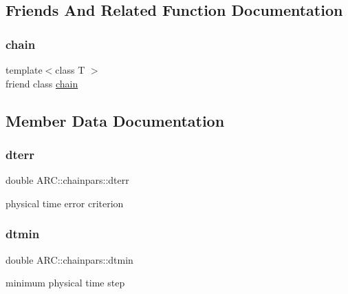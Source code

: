 \subsection{Friends And Related Function Documentation}
\hypertarget{classARC_1_1chainpars_a498fbb4337b9878a5f0044996e4a2489}{}\label{classARC_1_1chainpars_a498fbb4337b9878a5f0044996e4a2489} 
\subsubsection{\texorpdfstring{chain}{chain}}
{\footnotesize\ttfamily template$<$class T $>$ \\
friend class \hyperlink{classARC_1_1chain}{chain}\hspace{0.3cm}{\ttfamily [friend]}}



\subsection{Member Data Documentation}
\hypertarget{classARC_1_1chainpars_ad3a3e8f9199180ec82b9c257b1e8570e}{}\label{classARC_1_1chainpars_ad3a3e8f9199180ec82b9c257b1e8570e} 
\subsubsection{\texorpdfstring{dterr}{dterr}}
{\footnotesize\ttfamily double A\+R\+C\+::chainpars\+::dterr}



physical time error criterion 

\hypertarget{classARC_1_1chainpars_ac414014d19915aecb35245ba11649c2e}{}\label{classARC_1_1chainpars_ac414014d19915aecb35245ba11649c2e} 
\subsubsection{\texorpdfstring{dtmin}{dtmin}}
{\footnotesize\ttfamily double A\+R\+C\+::chainpars\+::dtmin}



minimum physical time step 

\hypertarget{classARC_1_1chainpars_a7ee477ebe8b1d67457891ab58560c074}{}\label{classARC_1_1chainpars_a7ee477ebe8b1d67457891ab58560c074} 

